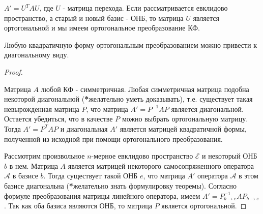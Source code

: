 $A' = U^TAU$, где $U$ - матрица перехода. Если рассматривается евклидово пространство, а старый и новый базис - ОНБ, то матрица $U$ является ортогональной и мы имеем ортогональное преобразование КФ.

\begin{theorem} 
    Любую квадратичную форму ортогональным преобразованием можно привести к диагональному виду.
\end{theorem}

\begin{proof}~

    Матрица $A$ любой КФ - симметричная. Любая симметричная матрица подобна некоторой диагональной (\textbf{*}желательно уметь доказывать), т.е. существует такая невырожденная матрица $P$, что матрица $A' = P^{-1}AP$ является диагональной. Остается убедиться, что в качестве $P$ можно выбрать ортогональную матрицу. Тогда $A' = P^TAP$ и диагональная $A'$ является матрицей квадратичной формы, полученной из исходной при помощи ортогонального преобразования.

    Рассмотрим произвольное $n$-мерное евклидово пространство $\mathcal{E}$ и некоторый ОНБ $b$ в нем. Матрица $A$ является матрицей некоторого самосопряженного оператора $\mathscr{A}$ в базисе $b$. Тогда существует такой ОНБ $e$, что матрица $A'$ оператора $\mathscr{A}$ в этом базисе диагональна (\textbf{*}желательно знать формулировку теоремы). Согласно формуле преобразования матрицы линейного оператора, имеем $A' = P_{b \to e}^{-1}AP_{b \to e}$. Так как оба базиса являются ОНБ, то матрица $P$ является ортогональной.
\end{proof}
